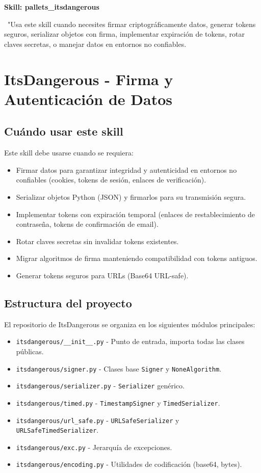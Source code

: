 \documentclass[11pt,a4paper]{article}
\newcommand{\iconoBanda}{microchip}
\newcommand{\bandaTitulo}[3][fondoOscuro]{%
  \begin{tcolorbox}[
    enhanced,
    colback=#1, colframe=#1,
    boxrule=0pt, arc=8pt, outer arc=8pt,
    width=\linewidth,
    top=18pt, bottom=6pt, left=14pt, right=14pt,
    borderline south={3.5pt}{0pt}{cyanNeon},
  ]
    \begin{minipage}[c]{0.07\linewidth}
      \centering
      \textcolor{cyanNeon}{\fontsize{30}{30}\selectfont\faIcon{\iconoBanda}}
    \end{minipage}%
    \hspace{8pt}%
    \begin{minipage}[c]{0.88\linewidth}
      {\fontsize{20}{24}\selectfont\bfseries\color{white}#2}\par\vspace{5pt}%
      \textcolor{cyanNeon!80!white}{\small\faIcon{angle-right}~#3}%
    \end{minipage}
    \vspace{4pt}
  \end{tcolorbox}%
  \vspace{8pt}%
}
\renewcommand{\iconoBanda}{book}
\begin{document}
\bandaTitulo[fondoOscuro]{Skill: pallets\_itsdangerous}{"Usa este skill cuando necesites firmar criptográficamente datos, generar tokens seguros, serializar objetos con firma, implementar expiración de tokens, rotar claves secretas, o manejar datos en entornos no confiables. }

\section*{ItsDangerous - Firma y Autenticación de Datos}


\subsection*{Cuándo usar este skill}


Este skill debe usarse cuando se requiera:


\begin{itemize}[leftmargin=*,topsep=2pt,itemsep=1pt]
  \item Firmar datos para garantizar integridad y autenticidad en entornos no confiables (cookies, tokens de sesión, enlaces de verificación).
  \item Serializar objetos Python (JSON) y firmarlos para su transmisión segura.
  \item Implementar tokens con expiración temporal (enlaces de restablecimiento de contraseña, tokens de confirmación de email).
  \item Rotar claves secretas sin invalidar tokens existentes.
  \item Migrar algoritmos de firma manteniendo compatibilidad con tokens antiguos.
  \item Generar tokens seguros para URLs (Base64 URL-safe).
\end{itemize}


\subsection*{Estructura del proyecto}


El repositorio de ItsDangerous se organiza en los siguientes módulos principales:


\begin{itemize}[leftmargin=*,topsep=2pt,itemsep=1pt]
  \item \texttt{itsdangerous/\_\_init\_\_.py} - Punto de entrada, importa todas las clases públicas.
  \item \texttt{itsdangerous/signer.py} - Clases base \texttt{Signer} y \texttt{NoneAlgorithm}.
  \item \texttt{itsdangerous/serializer.py} - \texttt{Serializer} genérico.
  \item \texttt{itsdangerous/timed.py} - \texttt{TimestampSigner} y \texttt{TimedSerializer}.
  \item \texttt{itsdangerous/url\_safe.py} - \texttt{URLSafeSerializer} y \texttt{URLSafeTimedSerializer}.
  \item \texttt{itsdangerous/exc.py} - Jerarquía de excepciones.
  \item \texttt{itsdangerous/encoding.py} - Utilidades de codificación (base64, bytes).
\end{itemize}
\end{document}
